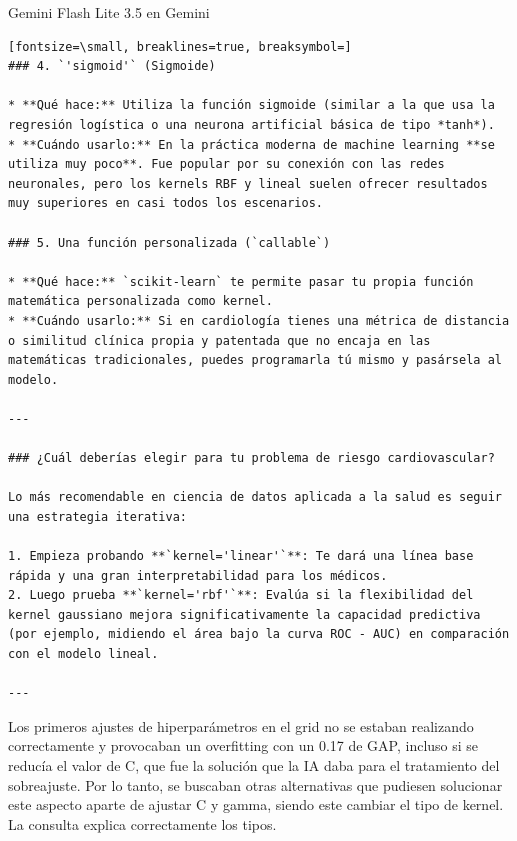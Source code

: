 \documentclass[12pt,a4paper,oneside]{book}
\begin{document}
\begin{iaresp}{Gemini Flash Lite 3.5 en Gemini}
\begin{Verbatim}[fontsize=\small, breaklines=true, breaksymbol=]
### 4. `'sigmoid'` (Sigmoide)

* **Qué hace:** Utiliza la función sigmoide (similar a la que usa la regresión logística o una neurona artificial básica de tipo *tanh*).
* **Cuándo usarlo:** En la práctica moderna de machine learning **se utiliza muy poco**. Fue popular por su conexión con las redes neuronales, pero los kernels RBF y lineal suelen ofrecer resultados muy superiores en casi todos los escenarios.

### 5. Una función personalizada (`callable`)

* **Qué hace:** `scikit-learn` te permite pasar tu propia función matemática personalizada como kernel.
* **Cuándo usarlo:** Si en cardiología tienes una métrica de distancia o similitud clínica propia y patentada que no encaja en las matemáticas tradicionales, puedes programarla tú mismo y pasársela al modelo.

---

### ¿Cuál deberías elegir para tu problema de riesgo cardiovascular?

Lo más recomendable en ciencia de datos aplicada a la salud es seguir una estrategia iterativa:

1. Empieza probando **`kernel='linear'`**: Te dará una línea base rápida y una gran interpretabilidad para los médicos.
2. Luego prueba **`kernel='rbf'`**: Evalúa si la flexibilidad del kernel gaussiano mejora significativamente la capacidad predictiva (por ejemplo, midiendo el área bajo la curva ROC - AUC) en comparación con el modelo lineal.

---
\end{Verbatim}
\end{iaresp}
\begin{iaanalisis}
Los primeros ajustes de hiperparámetros en el grid no se estaban realizando correctamente y provocaban un overfitting con un 0.17 de GAP, incluso si se reducía el valor de C, que fue la solución que la IA daba para el tratamiento del sobreajuste. Por lo tanto, se buscaban otras alternativas que pudiesen solucionar este aspecto aparte de ajustar C y gamma, siendo este cambiar el tipo de kernel. La consulta explica correctamente los tipos.
\end{iaanalisis}
\end{document}
